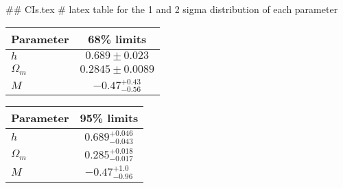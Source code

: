 ## CIs.tex
# latex table for the 1 and 2 sigma distribution of each parameter

\begin{tabular} { l  c}
 Parameter &  68\% limits\\
\hline
{\boldmath$h              $} & $0.689\pm 0.023            $\\
{\boldmath$\Omega_m       $} & $0.2845\pm 0.0089          $\\
{\boldmath$M              $} & $-0.47^{+0.43}_{-0.56}     $\\
\hline
\end{tabular}

\begin{tabular} { l  c}
 Parameter &  95\% limits\\
\hline
{\boldmath$h              $} & $0.689^{+0.046}_{-0.043}   $\\
{\boldmath$\Omega_m       $} & $0.285^{+0.018}_{-0.017}   $\\
{\boldmath$M              $} & $-0.47^{+1.0}_{-0.96}      $\\
\hline
\end{tabular}
